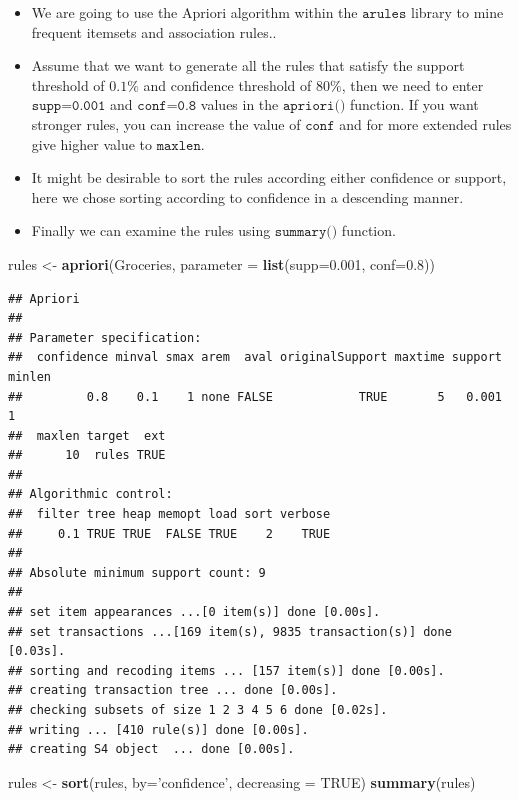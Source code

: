 \documentclass[
]{book}
\newenvironment{Shaded}{\begin{snugshade}}{\end{snugshade}}
\newcommand{\DataTypeTok}[1]{\textcolor[rgb]{0.13,0.29,0.53}{#1}}
\newcommand{\FloatTok}[1]{\textcolor[rgb]{0.00,0.00,0.81}{#1}}
\newcommand{\KeywordTok}[1]{\textcolor[rgb]{0.13,0.29,0.53}{\textbf{#1}}}
\newcommand{\NormalTok}[1]{#1}
\newcommand{\OtherTok}[1]{\textcolor[rgb]{0.56,0.35,0.01}{#1}}
\newcommand{\StringTok}[1]{\textcolor[rgb]{0.31,0.60,0.02}{#1}}
\begin{document}
\begin{itemize}
\item
  We are going to use the Apriori algorithm within the \(\texttt{arules}\) library to mine frequent itemsets and association rules..
\item
  Assume that we want to generate all the rules that satisfy the support threshold of \(0.1\%\) and confidence threshold of \(80\%\), then we need to enter \(\texttt{supp=0.001}\) and \(\texttt{conf=0.8}\) values in the \(\texttt{apriori()}\) function. If you want stronger rules, you can increase the value of \(\texttt{conf}\) and for more extended rules give higher value to \(\texttt{maxlen}\).
\item
  It might be desirable to sort the rules according either confidence or support, here we chose sorting according to confidence in a descending manner.
\item
  Finally we can examine the rules using \(\texttt{summary()}\) function.
\end{itemize}

\begin{Shaded}
\begin{Highlighting}[]
\NormalTok{rules <-}\StringTok{ }\KeywordTok{apriori}\NormalTok{(Groceries, }\DataTypeTok{parameter =} \KeywordTok{list}\NormalTok{(}\DataTypeTok{supp=}\FloatTok{0.001}\NormalTok{, }\DataTypeTok{conf=}\FloatTok{0.8}\NormalTok{))}
\end{Highlighting}
\end{Shaded}

\begin{verbatim}
## Apriori
## 
## Parameter specification:
##  confidence minval smax arem  aval originalSupport maxtime support minlen
##         0.8    0.1    1 none FALSE            TRUE       5   0.001      1
##  maxlen target  ext
##      10  rules TRUE
## 
## Algorithmic control:
##  filter tree heap memopt load sort verbose
##     0.1 TRUE TRUE  FALSE TRUE    2    TRUE
## 
## Absolute minimum support count: 9 
## 
## set item appearances ...[0 item(s)] done [0.00s].
## set transactions ...[169 item(s), 9835 transaction(s)] done [0.03s].
## sorting and recoding items ... [157 item(s)] done [0.00s].
## creating transaction tree ... done [0.00s].
## checking subsets of size 1 2 3 4 5 6 done [0.02s].
## writing ... [410 rule(s)] done [0.00s].
## creating S4 object  ... done [0.00s].
\end{verbatim}

\begin{Shaded}
\begin{Highlighting}[]
\NormalTok{rules <-}\StringTok{ }\KeywordTok{sort}\NormalTok{(rules, }\DataTypeTok{by=}\StringTok{'confidence'}\NormalTok{, }\DataTypeTok{decreasing =} \OtherTok{TRUE}\NormalTok{)}
\KeywordTok{summary}\NormalTok{(rules)}
\end{Highlighting}
\end{Shaded}
\end{document}
